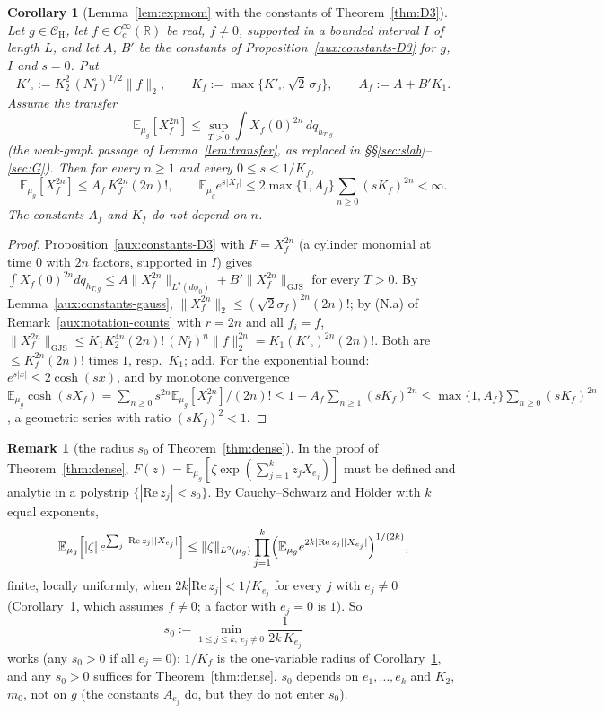 \documentclass[11pt,a4paper]{article}
\theoremstyle{plain}
\theoremstyle{definition}
\theoremstyle{plain}
\newtheorem{auxcor}[auxlemma]{Corollary}
\theoremstyle{definition}
\newtheorem{auxrem}[auxlemma]{Remark}
\newcommand{\R}{\mathbb{R}}
\newcommand{\E}{\mathbb{E}}
\newcommand{\CH}{\mathcal{C}_{\mathrm H}}
\newcommand{\GJS}[1]{\lVert #1\rVert_{\mathrm{GJS}}}   %
\newcommand{\dphi}{d\phi_0}
\begin{document}
\begin{auxcor}[Lemma~\ref{lem:expmom} with the constants of Theorem~\ref{thm:D3}]\label{aux:constants-76}
Let $g\in\CH$, let $f\in C_c^\infty(\R)$ be real, $f\ne0$, supported in a bounded interval $I$
of length $L$, and let $A$, $B'$ be the constants of Proposition~\ref{aux:constants-D3} for
$g$, $I$ and $s=0$.  Put
\[
 K'_\square:=K_2^2\,(N^{\square}_I)^{1/2}\|f\|_2,\qquad K_f:=\max\{K'_\square,\sqrt2\,\sigma_f\},
 \qquad A_f:=A+B'K_1 .
\]
Assume the transfer
\[
 \E_{\mu_g}[X_f^{2n}]\le\sup_{T>0}\int X_f(0)^{2n}\,dq_{h_{T,g}}
\]
(the weak-graph passage of Lemma~\ref{lem:transfer}, as replaced in \S\S\ref{sec:slab}--\ref{sec:G}).  Then for
every $n\ge1$ and every $0\le s<1/K_f$,
\[
 \E_{\mu_g}[X_f^{2n}]\le A_f\,K_f^{2n}(2n)!,\qquad
 \E_{\mu_g}e^{s|X_f|}\le2\max\{1,A_f\}\sum_{n\ge0}(sK_f)^{2n}<\infty .
\]
The constants $A_f$ and $K_f$ do not depend on $n$.
\end{auxcor}

\begin{proof}
Proposition~\ref{aux:constants-D3} with $F=X_f^{2n}$ (a cylinder monomial at time $0$ with $2n$
factors, supported in $I$) gives
$\int X_f(0)^{2n}dq_{h_{T,g}}\le A\|X_f^{2n}\|_{L^2(\dphi)}+B'\GJS{X_f^{2n}}$ for every $T>0$.
By Lemma~\ref{aux:constants-gauss}, $\|X_f^{2n}\|_2\le(\sqrt2\sigma_f)^{2n}(2n)!$; by (N.a) of
Remark~\ref{aux:notation-counts} with $r=2n$ and all $f_i=f$,
$\GJS{X_f^{2n}}\le K_1K_2^{4n}(2n)!\,(N^{\square}_I)^n\|f\|_2^{2n}=K_1(K'_\square)^{2n}(2n)!$.
Both are $\le K_f^{2n}(2n)!$ times $1$, resp.\ $K_1$; add.  For the exponential bound:
$e^{s|x|}\le2\cosh(sx)$, and by monotone convergence
$\E_{\mu_g}\cosh(sX_f)=\sum_{n\ge0}s^{2n}\E_{\mu_g}[X_f^{2n}]/(2n)!\le1+A_f\sum_{n\ge1}(sK_f)^{2n}
\le\max\{1,A_f\}\sum_{n\ge0}(sK_f)^{2n}$, a geometric series with ratio $(sK_f)^2<1$.
\end{proof}

\begin{auxrem}[the radius $s_0$ of Theorem~\ref{thm:dense}]\label{aux:constants-s0}
In the proof of Theorem~\ref{thm:dense}, $F(z)=\E_{\mu_g}[\overline\zeta
\exp(\sum_{j=1}^kz_jX_{e_j})]$ must be defined and analytic in a polystrip
$\{|\mathrm{Re}\,z_j|<s_0\}$.  By Cauchy--Schwarz and H\"older with $k$ equal exponents,
\[
 \E_{\mu_g}\Bigl[|\zeta|\,e^{\sum_j|\mathrm{Re}\,z_j||X_{e_j}|}\Bigr]\le\|\zeta\|_{L^2(\mu_g)}
 \prod_{j=1}^k\Bigl(\E_{\mu_g}e^{2k|\mathrm{Re}\,z_j||X_{e_j}|}\Bigr)^{1/(2k)} ,
\]
finite, locally uniformly, when $2k|\mathrm{Re}\,z_j|<1/K_{e_j}$ for every $j$ with
$e_j\ne0$ (Corollary~\ref{aux:constants-76}, which assumes $f\ne0$; a factor with $e_j=0$ is
$1$).  So
\[
 s_0:=\min_{1\le j\le k,\ e_j\ne0}\frac1{2k\,K_{e_j}}
\]
works (any $s_0>0$ if all $e_j=0$); $1/K_f$ is the one-variable radius of Corollary~\ref{aux:constants-76}, and any
$s_0>0$ suffices for Theorem~\ref{thm:dense}.  $s_0$ depends on $e_1,\dots,e_k$ and $K_2$, $m_0$, not on
$g$ (the constants $A_{e_j}$ do, but they do not enter $s_0$).
\end{auxrem}
\end{document}
